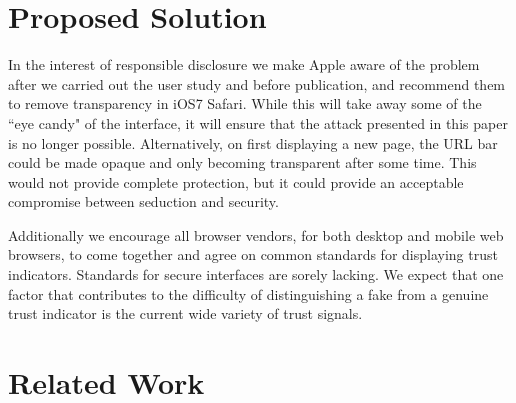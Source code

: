 \documentclass[twoside,letterpaper]{soups}
\begin{document}




\section{Proposed Solution}\label{chap:solution}


In the interest of responsible disclosure we make Apple aware of the problem after we carried out the user study and before publication, and recommend them to remove transparency in iOS7 Safari. While this will take away some of the ``eye candy" of the interface, it will ensure that the attack presented in this paper is no longer possible. Alternatively, on first displaying a new page, the URL bar could be made opaque and only becoming transparent after some time. This would not provide complete protection, but it could provide an acceptable compromise between seduction and security.

Additionally we encourage all browser vendors, for both desktop and mobile web browsers, to come together and agree on common standards for displaying trust indicators. Standards for secure interfaces are sorely lacking. We expect that one factor that contributes to the difficulty of distinguishing a fake from a genuine trust indicator is the current wide variety of trust signals. %

\section{Related Work}
\end{document}
